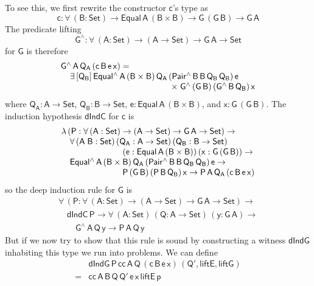 \documentclass[sigplan,screen]{acmart}
\begin{document}
To see this, we first rewrite the constructor $\mathsf{c}$'s type as
\[\mathsf{c : \forall\, (B : Set) \to Equal\,A\,(B \times B)
  \to G\,(G\,B) \to G\,A}\]
The predicate lifting
\[\mathsf{G^{\wedge} : \forall\, (A : Set) \to (A \to Set) \to G\,A \to
  Set}\] for $\mathsf{G}$ is therefore
\[\begin{array}{l}
\mathsf{G^{\wedge}\,A\,Q_A\,(c\,B\,e\,x) =}\\
\mathsf{\hspace*{0.15in}\exists\, [Q_B]\,
Equal^{\wedge}\,A\,(B \times
B)\,Q_A\,(Pair^{\wedge}\,B\,B\,Q_B\,Q_B)\,e}\\
\mathsf{\hspace*{1.8in}\times \;G^{\wedge}\,(G\,B)\,(G^{\wedge}\,B\,Q_B)\,x}
\end{array}\]
where $\mathsf{Q_A : A \to Set}$, $\mathsf{Q_B : B \to Set}$, $\mathsf{e
  : Equal\,A\,(B \times B)}$, and $\mathsf{x : G\,(G\,B)}$.
The induction hypothesis $\mathsf{dIndC}$ for $\mathsf{c}$ is
\[\begin{array}{l}
\mathsf{\lambda\, (P : \forall\, (A : Set) \to (A \to Set) \to G\,A
  \to Set)\to} \\ 
\quad\mathsf{ \forall\, (A\;B : Set)\, (Q_A : A \to Set)\, (Q_B : B
  \to Set)}\\
\hspace*{1in}\mathsf{(e : Equal\,A\,(B \times B))\, (x : G\,(G\,B))\to} \\ 
\quad\mathsf{Equal^{\wedge}\,A\,(B \times
  B)\,Q_A\,(Pair^{\wedge}\,B\,B\,Q_B\,Q_B)\,e \to}\\
\hspace*{1in}\mathsf{P\,(G\,B)\,(P\,B\,Q_B)\,x 
	\to P\,A\,Q_A\,(c\,B\, e\,x)} 
\end{array}\]
so the deep induction rule for $\mathsf{G}$ is
\[\begin{array}{l}
\mathsf{\forall\, (P : \forall\, (A : Set) \to (A \to Set) \to G\,A \to Set)
  \to}\\
\quad\mathsf{dIndC\,P \to \forall\, (A : Set)\, (Q : A \to Set)\, (y : G\,A)
  \to}\\
\quad\quad\mathsf{G^{\wedge}\,A\,Q\,y \to P\,A\,Q\,y}
\end{array}\] But if we now try to show
that this rule is sound by constructing a witness $\mathsf{dIndG}$
inhabiting this type we run into problems. We can define
\[\begin{array}{ll}
  & \mathsf{dIndG\,P\,cc\,A\,Q\,(c\,B\,e\,x)\,(Q', liftE, liftG)}\\
= & \mathsf{cc\,A\,B\,Q\,Q'\,e\,x\,liftE\,p}
\end{array}\]
\end{document}

